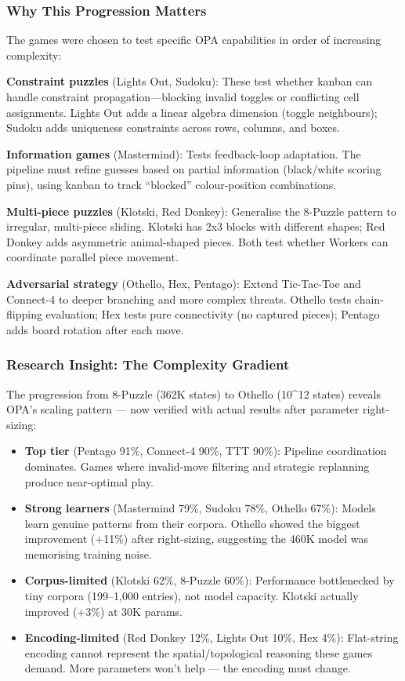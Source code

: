 \documentclass[
]{article}
\providecommand{\tightlist}{%
  \setlength{\itemsep}{0pt}\setlength{\parskip}{0pt}}
\begin{document}
\subsubsection{Why This Progression
Matters}\label{why-this-progression-matters}

The games were chosen to test specific OPA capabilities in order of
increasing complexity:

\textbf{Constraint puzzles} (Lights Out, Sudoku): These test whether
kanban can handle constraint propagation---blocking invalid toggles or
conflicting cell assignments. Lights Out adds a linear algebra dimension
(toggle neighbours); Sudoku adds uniqueness constraints across rows,
columns, and boxes.

\textbf{Information games} (Mastermind): Tests feedback-loop adaptation.
The pipeline must refine guesses based on partial information
(black/white scoring pins), using kanban to track ``blocked''
colour-position combinations.

\textbf{Multi-piece puzzles} (Klotski, Red Donkey): Generalise the
8-Puzzle pattern to irregular, multi-piece sliding. Klotski has 2x3
blocks with different shapes; Red Donkey adds asymmetric animal-shaped
pieces. Both test whether Workers can coordinate parallel piece
movement.

\textbf{Adversarial strategy} (Othello, Hex, Pentago): Extend
Tic-Tac-Toe and Connect-4 to deeper branching and more complex threats.
Othello tests chain-flipping evaluation; Hex tests pure connectivity (no
captured pieces); Pentago adds board rotation after each move.

\subsubsection{Research Insight: The Complexity
Gradient}\label{research-insight-the-complexity-gradient}

The progression from 8-Puzzle (362K states) to Othello (10\^{}12 states)
reveals OPA's scaling pattern --- now verified with actual results after
parameter right-sizing:

\begin{itemize}
\tightlist
\item
  \textbf{Top tier} (Pentago 91\%, Connect-4 90\%, TTT 90\%): Pipeline
  coordination dominates. Games where invalid-move filtering and
  strategic replanning produce near-optimal play.
\item
  \textbf{Strong learners} (Mastermind 79\%, Sudoku 78\%, Othello 67\%):
  Models learn genuine patterns from their corpora. Othello showed the
  biggest improvement (+11\%) after right-sizing, suggesting the 460K
  model was memorising training noise.
\item
  \textbf{Corpus-limited} (Klotski 62\%, 8-Puzzle 60\%): Performance
  bottlenecked by tiny corpora (199--1,000 entries), not model capacity.
  Klotski actually improved (+3\%) at 30K params.
\item
  \textbf{Encoding-limited} (Red Donkey 12\%, Lights Out 10\%, Hex 4\%):
  Flat-string encoding cannot represent the spatial/topological
  reasoning these games demand. More parameters won't help --- the
  encoding must change.
\end{itemize}
\end{document}
